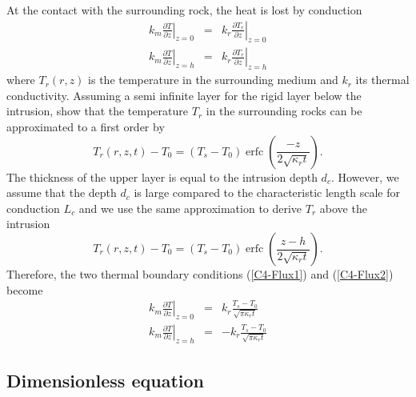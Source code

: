 At  the  contact with  the  surrounding  rock,  the  heat is  lost  by
conduction
\begin{eqnarray}
  k_m\left.\frac{\partial                                    T}{\partial
      z}\right|_{z=0}&=&k_r\left.\frac{\partial              T_r}{\partial
      z}\right|_{z=0}  \label{C4-Flux1}\\
  k_m\left.\frac{\partial                                  T}{\partial
      z}\right|_{z=h}&=&k_r\left.\frac{\partial            T_r}{\partial
      z}\right|_{z=h}
  \label{C4-Flux2}
\end{eqnarray}
where  $T_r(r,z)$ is  the temperature  in the  surrounding medium  and
$k_r$ its  thermal conductivity.  Assuming  a semi infinite  layer for
the rigid layer below  the intrusion, \citet{Carslaw:1959wf} show that
the temperature $T_r$ in the  surrounding rocks can be approximated to
a first order by
\begin{equation}
  T_r(r,z,t)-T_0=(T_{s}-T_0)\operatorname{erfc}{\left(\frac{-z}{2\sqrt{\kappa_r t}}\right)}.
  \label{eq22}
\end{equation}
The  thickness of  the upper  layer is  equal to  the intrusion  depth
$d_c$. However,  we assume that the  depth $d_c$ is large  compared to
the characteristic  length scale for  conduction $L_c$ and we  use the
same approximation to derive $T_r$ above the intrusion
\begin{equation}
  T_r(r,z,t)-T_0=(T_{s}-T_0)\operatorname{erfc}{\left(\frac{z-h}{2\sqrt{\kappa_r t}}\right)}.
  \label{eq11}
\end{equation}
Therefore, the  two thermal  boundary conditions  (\ref{C4-Flux1}) and
(\ref{C4-Flux2}) become
\begin{eqnarray}
  k_m\left.\frac{\partial                                    T}{\partial
      z}\right|_{z=0}&=& k_r
  \frac{T_{s}-T_{0}}{\sqrt{\pi \kappa_r t}}  \label{C4-2Flux2}\\
  k_m\left.\frac{\partial                                    T}{\partial
      z}\right|_{z=h}&=& -k_r
  \frac{T_{s}-T_{0}}{\sqrt{\pi \kappa_r t}}
  \label{C4-2Flux_2}
\end{eqnarray}

\subsection{Dimensionless equation}


